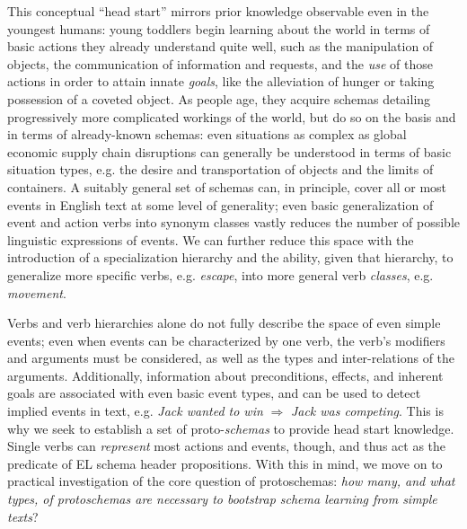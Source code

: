 This conceptual ``head start'' mirrors prior knowledge observable even in the youngest humans: young toddlers begin learning about the world in terms of basic actions they already understand quite well, such as the manipulation of objects, the communication of information and requests, and the \textit{use} of those actions in order to attain innate \textit{goals}, like the alleviation of hunger or taking possession of a coveted object. As people age, they acquire schemas detailing progressively more complicated workings of the world, but do so on the basis and in terms of already-known schemas: even situations as complex as global economic supply chain disruptions can generally be understood in terms of basic situation types, e.g. the desire and transportation of objects and the limits of containers.
A suitably general set of schemas can, in principle, cover all or most events in English text at some level of generality; even basic generalization of event and action verbs into synonym classes vastly reduces the number of possible linguistic expressions of events. We can further reduce this space with the introduction of a specialization hierarchy and the ability, given that hierarchy, to generalize more specific verbs, e.g. \textit{escape}, into more general verb \textit{classes}, e.g. \textit{movement}.

Verbs and verb hierarchies alone do not fully describe the space of even simple events; even when events can be characterized by one verb, the verb's modifiers and arguments must be considered, as well as the types and inter-relations of the arguments. Additionally, information about preconditions, effects, and inherent goals are associated with even basic event types, and can be used to detect implied events in text, e.g. \textit{Jack wanted to win} $\Rightarrow$ \textit{Jack was competing}.
This is why we seek to establish a set of proto-\textit{schemas} to provide head start knowledge.
Single verbs can \textit{represent} most actions and events, though, and thus act as the predicate of EL schema header propositions. With this in mind, we move on to practical investigation of the core question of protoschemas: \textit{how many, and what types, of protoschemas are necessary to bootstrap schema learning from simple texts}?

